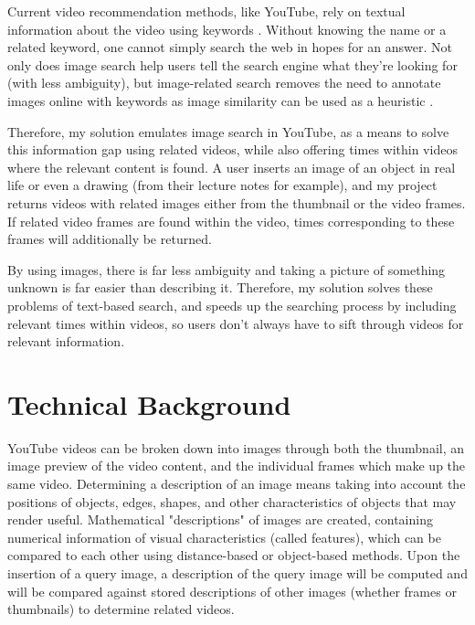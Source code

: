 \documentclass[10pt,twocolumn]{article}
\begin{document}
Current video recommendation methods, like YouTube, rely on textual information about the video using keywords \cite{Stanford2021}. Without knowing the name or a related keyword, one cannot simply search the web in hopes for an answer. Not only does image search help users tell the search engine what they’re looking for (with less ambiguity), but image-related search removes the need to annotate images online with keywords as image similarity can be used as a heuristic \cite{Adrakatti2016}.

Therefore, my solution emulates image search in YouTube, as a means to solve this information gap using related videos, while also offering times within videos where the relevant content is found. A user inserts an image of an object in real life or even a drawing (from their lecture notes for example), and my project returns videos with related images either from the thumbnail or the video frames. If related video frames are found within the video, times corresponding to these frames will additionally be returned.

By using images, there is far less ambiguity and taking a picture of something unknown is far easier than describing it. Therefore, my solution solves these problems of text-based search, and speeds up the searching process by including relevant times within videos, so users don't always have to sift through videos for relevant information.


\section{Technical Background} 

YouTube videos can be broken down into images through both the thumbnail, an image preview of the video content, and the individual frames which make up the same video. Determining a description of an image means taking into account the positions of objects, edges, shapes, and other characteristics of objects that may render useful. Mathematical "descriptions" of images are created, containing numerical information of visual characteristics (called features), which can be compared to each other using distance-based or object-based methods. Upon the insertion of a query image, a description of the query image will be computed and will be compared against stored descriptions of other images (whether frames or thumbnails) to determine related videos.
\end{document}

